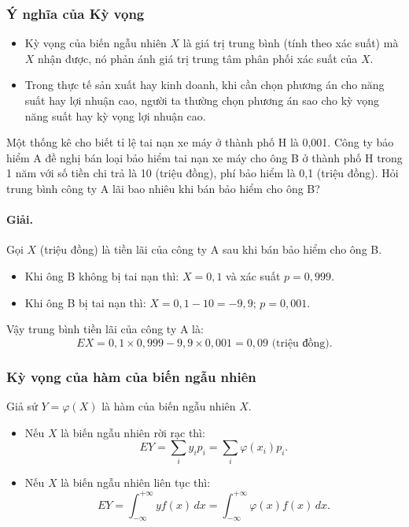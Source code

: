 \subsubsection{Ý nghĩa của Kỳ vọng}
\begin{itemize}
    \item Kỳ vọng của biến ngẫu nhiên $X$ là giá trị trung bình (tính theo xác suất) mà $X$ nhận được, nó phản ánh giá trị trung tâm phân phối xác suất của $X$.
    \item Trong thực tế sản xuất hay kinh doanh, khi cần chọn phương án cho năng suất hay lợi nhuận cao, người ta thường chọn phương án sao cho kỳ vọng năng suất hay kỳ vọng lợi nhuận cao.
\end{itemize}

\begin{vidu}[VD 9]
Một thống kê cho biết tỉ lệ tai nạn xe máy ở thành phố H là 0,001. Công ty bảo hiểm A đề nghị bán loại bảo hiểm tai nạn xe máy cho ông B ở thành phố H trong 1 năm với số tiền chi trả là 10 (triệu đồng), phí bảo hiểm là 0,1 (triệu đồng). Hỏi trung bình công ty A lãi bao nhiêu khi bán bảo hiểm cho ông B?

\paragraph{Giải.} Gọi $X$ (triệu đồng) là tiền lãi của công ty A sau khi bán bảo hiểm cho ông B.
\begin{itemize}
    \item Khi ông B không bị tai nạn thì: $X = 0{,}1$ và xác suất $p = 0{,}999$.
    \item Khi ông B bị tai nạn thì: $X = 0{,}1 - 10 = -9{,}9$; $p = 0{,}001$.
\end{itemize}
Vậy trung bình tiền lãi của công ty A là:
\[
EX = 0{,}1 \times 0{,}999 - 9{,}9 \times 0{,}001 = 0{,}09 \text{ (triệu đồng)}.
\]
\end{vidu}

\subsubsection{Kỳ vọng của hàm của biến ngẫu nhiên}
Giả sử $Y = \varphi(X)$ là hàm của biến ngẫu nhiên $X$.
\begin{itemize}
    \item Nếu $X$ là biến ngẫu nhiên rời rạc thì:
    \[
    EY = \sum_i y_i p_i = \sum_i \varphi(x_i) p_i.
    \]
    \item Nếu $X$ là biến ngẫu nhiên liên tục thì:
    \[
    EY = \int_{-\infty}^{+\infty} y f(x)\,dx = \int_{-\infty}^{+\infty} \varphi(x) f(x)\,dx.
    \]
\end{itemize}

